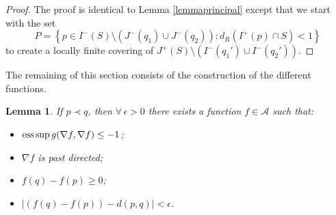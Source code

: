 \documentclass[11pt]{article}
\newtheorem{lemma}{Lemma}
\newcommand{\abs}[1]{\left\vert {#1} \right\vert}
\newcommand{\set}[1]{\left\{ {#1} \right\}}
\newcommand{\parenthese}[1]{\left( {#1} \right)}
\begin{document}
\begin{proof}
The proof is identical to Lemma \ref{lemmaprincipal} except that we start with the set \[
P = \set{ p \in I^-(S) \setminus \parenthese{J^-(q_1) \cup J^-(q_2)} : d_R(I^+(p) \cap S) < 1}
\]
to create a locally f\/inite covering of $J^+(S) \setminus \parenthese{ I^-(q_1') \cup I^-(q_2') }$.
\end{proof}

The remaining of this section consists of the construction of the dif\/ferent functions.

\begin{lemma}\label{equality}
If $p \prec q$, then $\forall\, \epsilon > 0$ there exists a function $f\in \mathcal A$ such that:
\begin{itemize}
\item $\text{\rm ess} \sup g( \nabla f, \nabla f ) \leq -1$;
\item $\nabla f$ is past directed;
\item $f(q)-f(p) \geq 0$;
\item $\abs{(f(q)-f(p)) - d(p,q)} < \epsilon$.
\end{itemize}

\end{lemma}
\end{document}
